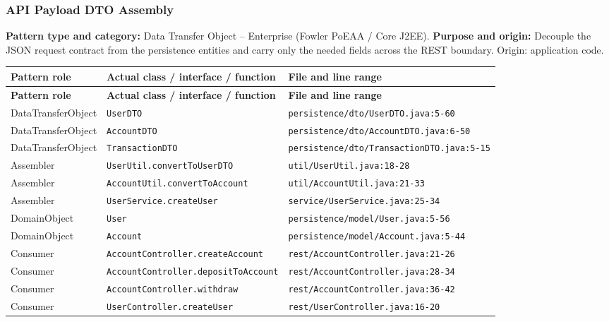 \documentclass[11pt,a4paper]{article}
\begin{document}
\subsubsection{API Payload DTO Assembly}
\textbf{Pattern type and category:} Data Transfer Object -- Enterprise (Fowler PoEAA / Core J2EE). \textbf{Purpose and origin:} Decouple the JSON request contract from the persistence entities and carry only the needed fields across the REST boundary. Origin: application code.
{\footnotesize
\begin{longtable}{@{}p{3.1cm}p{5.6cm}p{7cm}@{}}
\toprule \textbf{Pattern role} & \textbf{Actual class / interface / function} & \textbf{File and line range} \\ \midrule \endfirsthead
\toprule \textbf{Pattern role} & \textbf{Actual class / interface / function} & \textbf{File and line range} \\ \midrule \endhead
\bottomrule \endfoot
DataTransferObject & \texttt{UserDTO} & \texttt{persistence/\allowbreak{}dto/\allowbreak{}UserDTO.\allowbreak{}java:\allowbreak{}5-60} \\
DataTransferObject & \texttt{AccountDTO} & \texttt{persistence/\allowbreak{}dto/\allowbreak{}AccountDTO.\allowbreak{}java:\allowbreak{}6-50} \\
DataTransferObject & \texttt{TransactionDTO} & \texttt{persistence/\allowbreak{}dto/\allowbreak{}TransactionDTO.\allowbreak{}java:\allowbreak{}5-15} \\
Assembler & \texttt{UserUtil.\allowbreak{}convertToUserDTO} & \texttt{util/\allowbreak{}UserUtil.\allowbreak{}java:\allowbreak{}18-28} \\
Assembler & \texttt{AccountUtil.\allowbreak{}convertToAccount} & \texttt{util/\allowbreak{}AccountUtil.\allowbreak{}java:\allowbreak{}21-33} \\
Assembler & \texttt{UserService.\allowbreak{}createUser} & \texttt{service/\allowbreak{}UserService.\allowbreak{}java:\allowbreak{}25-34} \\
DomainObject & \texttt{User} & \texttt{persistence/\allowbreak{}model/\allowbreak{}User.\allowbreak{}java:\allowbreak{}5-56} \\
DomainObject & \texttt{Account} & \texttt{persistence/\allowbreak{}model/\allowbreak{}Account.\allowbreak{}java:\allowbreak{}5-44} \\
Consumer & \texttt{AccountController.\allowbreak{}createAccount} & \texttt{rest/\allowbreak{}AccountController.\allowbreak{}java:\allowbreak{}21-26} \\
Consumer & \texttt{AccountController.\allowbreak{}depositToAccount} & \texttt{rest/\allowbreak{}AccountController.\allowbreak{}java:\allowbreak{}28-34} \\
Consumer & \texttt{AccountController.\allowbreak{}withdraw} & \texttt{rest/\allowbreak{}AccountController.\allowbreak{}java:\allowbreak{}36-42} \\
Consumer & \texttt{UserController.\allowbreak{}createUser} & \texttt{rest/\allowbreak{}UserController.\allowbreak{}java:\allowbreak{}16-20} \\
\end{longtable}
}
\end{document}
